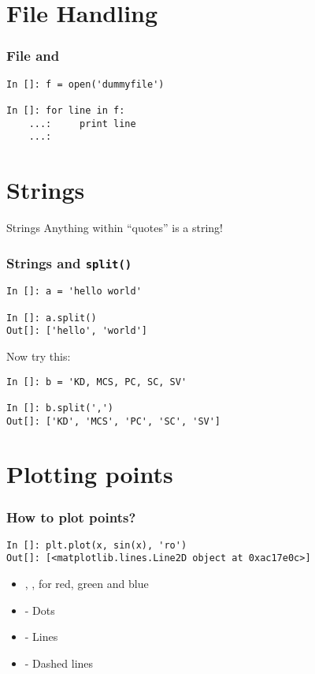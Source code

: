 \documentclass[14pt,compress]{beamer}
\newcounter{time}
\newcommand{\inctime}[1]{\addtocounter{time}{#1}{\tiny \thetime\ m}}
\newcommand{\typ}[1]{\lstinline{#1}}
\newcommand{\kwrd}[1]{ \texttt{\textbf{\color{blue}{#1}}}  }
\begin{document}
\section{File Handling}
\begin{frame}[fragile]
    \frametitle{File and \kwrd{for}}
\begin{lstlisting}
In []: f = open('dummyfile')

In []: for line in f:
    ...:     print line
    ...:  
\end{lstlisting}
\inctime{5}
\end{frame}

\section{Strings}
\begin{frame}{Strings}
Anything within ``quotes'' is a string!
\end{frame}

\begin{frame}[fragile]\frametitle{Strings and \typ{split()}}
  \begin{lstlisting}
In []: a = 'hello world'

In []: a.split()
Out[]: ['hello', 'world']
  \end{lstlisting}
Now try this:
  \begin{lstlisting}
In []: b = 'KD, MCS, PC, SC, SV'

In []: b.split(',')
Out[]: ['KD', 'MCS', 'PC', 'SC', 'SV']
  \end{lstlisting}
\inctime{5}
\end{frame}

\section{Plotting points}
\begin{frame}[fragile]
\frametitle{How to plot points?}
\begin{lstlisting}
In []: plt.plot(x, sin(x), 'ro')
Out[]: [<matplotlib.lines.Line2D object at 0xac17e0c>]
\end{lstlisting}
\begin{itemize}
  \item \kwrd{'r'},\kwrd{'g'},\kwrd{'b'} for red, green and blue
  \item \kwrd{'o'} - Dots
  \item \kwrd{'-'} - Lines
  \item \kwrd{'- -'} - Dashed lines
\end{itemize}
\inctime{5}
\end{frame}
\end{document}
